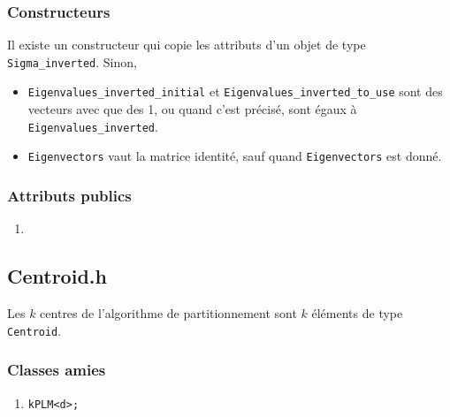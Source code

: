 \documentclass[10pt,a4paper,notitlepage]{article}
\begin{document}
\subsubsection{Constructeurs}
Il existe un constructeur qui copie les attributs d'un objet de type \texttt{Sigma\_inverted}. Sinon,
\begin{itemize}
\item \texttt{Eigenvalues\_inverted\_initial} et \texttt{Eigenvalues\_inverted\_to\_use} sont des vecteurs avec que des 1, ou quand c'est précisé, sont égaux à \texttt{Eigenvalues\_inverted}.
\item \texttt{Eigenvectors} vaut la matrice identité, sauf quand \texttt{Eigenvectors} est donné.
\end{itemize}
\subsubsection{Attributs publics}
\begin{enumerate}
\item
\end{enumerate}

\subsection{Centroid.h}
Les $k$ centres de l'algorithme de partitionnement sont $k$ éléments de type \texttt{Centroid}.


\subsubsection{Classes amies}
\begin{enumerate}
\item \texttt{kPLM<d>;}
\end{enumerate}
\end{document}
